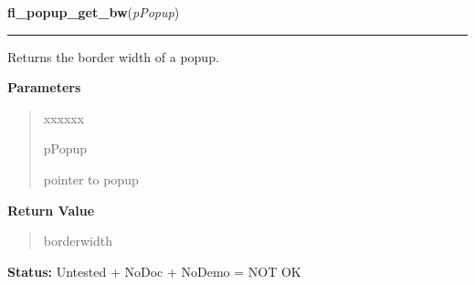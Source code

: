 \hspace{.8\funcindent}\begin{boxedminipage}{\funcwidth}

    \raggedright \textbf{fl\_popup\_get\_bw}(\textit{pPopup})

    \vspace{-1.5ex}

    \rule{\textwidth}{0.5\fboxrule}
\setlength{\parskip}{2ex}
    Returns the border width of a popup.

\setlength{\parskip}{1ex}
      \textbf{Parameters}
      \vspace{-1ex}

      \begin{quote}
        \begin{Ventry}{xxxxxx}

          \item[pPopup]

          pointer to popup

        \end{Ventry}

      \end{quote}

      \textbf{Return Value}
    \vspace{-1ex}

      \begin{quote}
      borderwidth

      \end{quote}

\textbf{Status:} Untested + NoDoc + NoDemo = NOT OK



    \end{boxedminipage}

    \label{xformslib:library:fl_popup_set_bw}

    \vspace{0.5ex}

